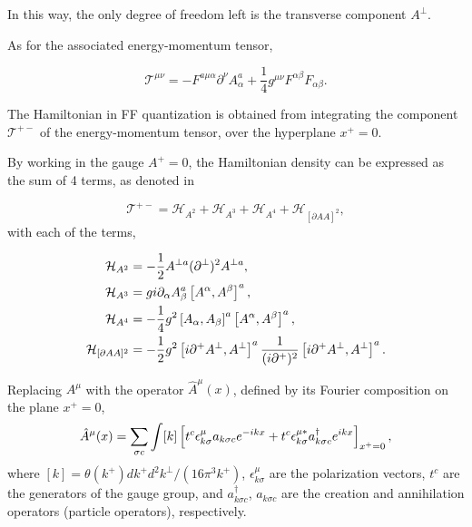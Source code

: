 \documentclass[11pt,a4paper,twoside,pdf]{article}
\numberwithin{equation}{section}
\begin{document}
In this way, the only degree of freedom left is the transverse component $A^\perp$.

As for the associated energy-momentum tensor,

\begin{equation}
    \mathcal{T}^{\mu\nu} = -F^{a\mu\alpha}\partial^\nu A^a_\alpha + 
    \frac{1}{4}g^{\mu\nu}F^{\alpha\beta} F_{\alpha\beta}.
\end{equation}

The Hamiltonian in FF quantization is obtained from integrating the component
$\mathcal{T}^{+-}$ of the energy-momentum tensor, over the hyperplane $x^+=0$. 

By working in the gauge $A^+=0$, the Hamiltonian density can be expressed as the sum of 
4 terms, as denoted in \cite{glazek_dynamics_2001}

\begin{equation}
    \mathcal{T}^{+-} = \mathcal{H}_{A^2} + \mathcal{H}_{A^3} +
    \mathcal{H}_{A^4} + \mathcal{H}_{[\partial AA]^2},
\end{equation}
with each of the terms, 

\begin{align}
    \mathcal{H}_{A^2} &= -\frac{1}{2} A^{\perp a} (\partial^\perp)^2 A^{\perp a}, \\
    \mathcal{H}_{A^3} &= g i \partial_\alpha A^a_\beta \left[ A^\alpha, A^\beta \right]^a, \\
    \mathcal{H}_{A^4} &= -\frac{1}{4} g^2 \left[ A_\alpha, A_\beta \right]^a
    \left[ A^\alpha, A^\beta \right]^a, \\
    \mathcal{H}_{[\partial AA]^2} &= -\frac{1}{2} g^2 \left[ i \partial^+ A^\perp,
    A^\perp \right]^a  \frac{1}{(i\partial^+)^2} \left[ i\partial^+ A^\perp, A^\perp \right]^a.
\end{align}

Replacing $A^\mu$ with the operator $\hat{A}^\mu(x)$, defined by its Fourier composition
on the plane $x^+=0$,
\begin{equation}
    \hat{A}^\mu(x) = \sum _{\sigma c} \int [k] \left[ t^c \epsilon^\mu_{k \sigma} 
    a_{k\sigma c}  e^{-ikx} + t^c \epsilon^{\mu*}_{k \sigma} 
    a^\dagger_{k\sigma c}  e^{ikx} \right]_{x^+=0},
\end{equation}
where $[k] = \theta(k^+) dk^+ d^2k^\perp / (16\pi^3k^+)$, $\epsilon^\mu_{k \sigma}$ 
are the polarization vectors, $t^c$ are the generators of the gauge group, and $a^\dagger_{k\sigma c}$, $a_{k\sigma c}$ are the 
creation and annihilation operators (particle operators), respectively. 
\end{document}
